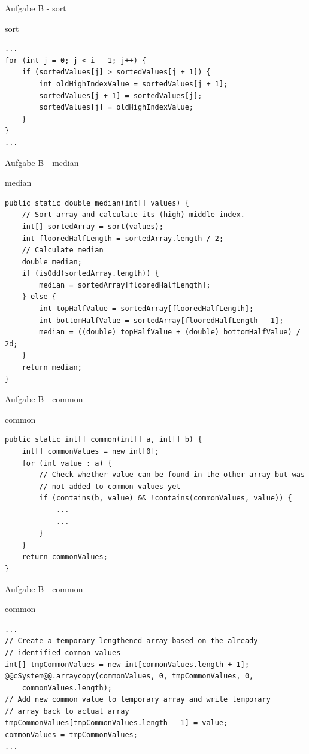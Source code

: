 \documentclass[aspectratio=169]{beamer}
\begin{document}
\begin{frame}[fragile]{Aufgabe B - sort}
  \begin{block}{sort}
    \begin{lstlisting}
...
for (int j = 0; j < i - 1; j++) {
    if (sortedValues[j] > sortedValues[j + 1]) {
        int oldHighIndexValue = sortedValues[j + 1];
        sortedValues[j + 1] = sortedValues[j];
        sortedValues[j] = oldHighIndexValue;
    }
}
...
    \end{lstlisting}
  \end{block}
\end{frame}

\begin{frame}[fragile]{Aufgabe B - median}
  \begin{block}{median}
    \begin{lstlisting}
public static double median(int[] values) {
    // Sort array and calculate its (high) middle index.
    int[] sortedArray = sort(values);
    int flooredHalfLength = sortedArray.length / 2;
    // Calculate median
    double median;
    if (isOdd(sortedArray.length)) {
        median = sortedArray[flooredHalfLength];
    } else {
        int topHalfValue = sortedArray[flooredHalfLength];
        int bottomHalfValue = sortedArray[flooredHalfLength - 1];
        median = ((double) topHalfValue + (double) bottomHalfValue) / 2d;
    }
    return median;
}
    \end{lstlisting}
  \end{block}
\end{frame}

\begin{frame}[fragile]{Aufgabe B - common}
  \begin{block}{common}
    \begin{lstlisting}
public static int[] common(int[] a, int[] b) {
    int[] commonValues = new int[0];
    for (int value : a) {
        // Check whether value can be found in the other array but was
        // not added to common values yet
        if (contains(b, value) && !contains(commonValues, value)) {
            ...
            ...
        }
    }
    return commonValues;
}
    \end{lstlisting}
  \end{block}
\end{frame}

\begin{frame}[fragile]{Aufgabe B - common}
  \begin{block}{common}
    \begin{lstlisting}
...
// Create a temporary lengthened array based on the already
// identified common values
int[] tmpCommonValues = new int[commonValues.length + 1];
@@cSystem@@.arraycopy(commonValues, 0, tmpCommonValues, 0,
    commonValues.length);
// Add new common value to temporary array and write temporary
// array back to actual array
tmpCommonValues[tmpCommonValues.length - 1] = value;
commonValues = tmpCommonValues;
...
    \end{lstlisting}
  \end{block}
\end{frame}
\end{document}
